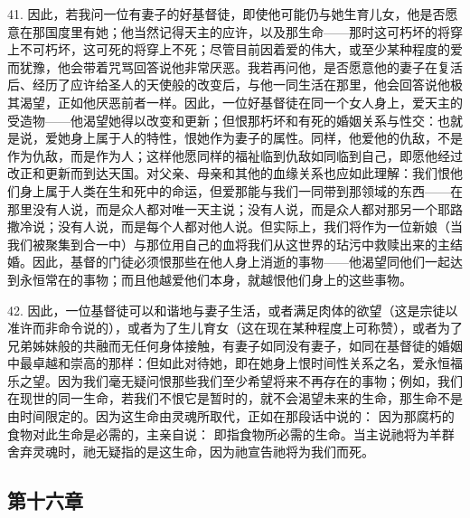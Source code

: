 41. 因此，若我问一位有妻子的好基督徒，即使他可能仍与她生育儿女，他是否愿意在那国度里有她；他当然记得天主的应许，以及那生命——那时这可朽坏的将穿上不可朽坏，这可死的将穿上不死；尽管目前因着爱的伟大，或至少某种程度的爱而犹豫，他会带着咒骂回答说他非常厌恶。我若再问他，是否愿意他的妻子在复活后、经历了应许给圣人的天使般的改变后，与他一同生活在那里，他会回答说他极其渴望，正如他厌恶前者一样。因此，一位好基督徒在同一个女人身上，爱天主的受造物——他渴望她得以改变和更新；但恨那朽坏和有死的婚姻关系与性交：也就是说，爱她身上属于人的特性，恨她作为妻子的属性。同样，他爱他的仇敌，不是作为仇敌，而是作为人；这样他愿同样的福祉临到仇敌如同临到自己，即愿他经过改正和更新而到达天国。对父亲、母亲和其他的血缘关系也应如此理解：我们恨他们身上属于人类在生和死中的命运，但爱那能与我们一同带到那领域的东西——在那里没有人说，而是众人都对唯一天主说；没有人说，而是众人都对那另一个耶路撒冷说；没有人说，而是每个人都对他人说。但实际上，我们将作为一位新娘（当我们被聚集到合一中）与那位用自己的血将我们从这世界的玷污中救赎出来的主结婚。因此，基督的门徒必须恨那些在他人身上消逝的事物——他渴望同他们一起达到永恒常在的事物；而且他越爱他们本身，就越恨他们身上的这些事物。\par

42. 因此，一位基督徒可以和谐地与妻子生活，或者满足肉体的欲望（这是宗徒以准许而非命令说的），或者为了生儿育女（这在现在某种程度上可称赞），或者为了兄弟姊妹般的共融而无任何身体接触，有妻子如同没有妻子，如同在基督徒的婚姻中最卓越和崇高的那样：但如此对待她，即在她身上恨时间性关系之名，爱永恒福乐之望。因为我们毫无疑问恨那些我们至少希望将来不再存在的事物；例如，我们在现世的同一生命，若我们不恨它是暂时的，就不会渴望未来的生命，那生命不是由时间限定的。因为这生命由灵魂所取代，正如在那段话中说的： 因为那腐朽的食物对此生命是必需的，主亲自说： 即指食物所必需的生命。当主说祂将为羊群舍弃灵魂时，祂无疑指的是这生命，因为祂宣告祂将为我们而死。\par


\subsection{第十六章}

